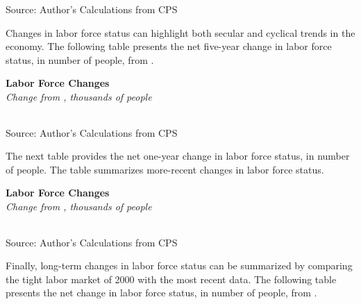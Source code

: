 \documentclass{report}
\begin{document}
{\begin{minipage}{0.76\textwidth}
\footnotesize{Source: Author's Calculations from CPS}
\vspace{4mm}

\small Changes in labor force status can highlight both secular and cyclical trends in the economy. The following table presents the net five-year change in labor force status, in number of people, from \unskip.
\vspace{1mm}

\normalsize \textbf{Labor Force Changes}\\
\footnotesize{\textit{Change from \unskip, thousands of people}}\\
\noindent {} \setlength{\tabcolsep}{3.0pt} \color{black!90}
		{\renewcommand{\arraystretch}{1.5}
\hspace*{-1mm} \begin{tabular}{p{28.5mm} R{11.2mm} R{10.4mm} R{10.4mm} R{10.2mm} 
		 				 R{10.6mm} R{10.4mm} R{10.4mm}}
			  \hline
		\end{tabular}}
		\vspace{-3mm}
		
\footnotesize{Source: Author's Calculations from CPS}
\end{minipage}
\newpage
\begin{minipage}{0.76\textwidth} \small The next table provides the net one-year change in labor force status, in number of people. The table summarizes more-recent changes in labor force status. 
\vspace{1mm}

\normalsize \textbf{Labor Force Changes}\\
\footnotesize{\textit{Change from \unskip, thousands of people}}\\
\noindent {} \setlength{\tabcolsep}{3.0pt} \color{black!90}
		{\renewcommand{\arraystretch}{1.5}
\hspace*{-1mm} \begin{tabular}{p{28.5mm} R{11.2mm} R{10.4mm} R{10.4mm} R{10.2mm} 
		 				 R{10.6mm} R{10.4mm} R{10.4mm}}
			  \hline
		\end{tabular}}
		\vspace{-3mm}
		
\footnotesize{Source: Author's Calculations from CPS}
\vspace{4mm}

\small Finally, long-term changes in labor force status can be summarized by comparing the tight labor market of 2000 with the most recent data. The following table presents the net change in labor force status, in number of people, from \unskip.
\vspace{1mm}


\end{minipage}}
\end{document}
